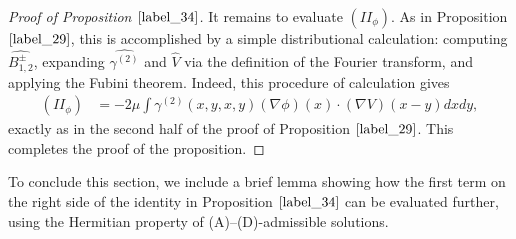 \documentclass[reqno]{amsart}
\numberwithin{equation}{section}
\theoremstyle{remark}
\begin{document}
\begin{proof}[Proof of Proposition $\ref{label_34}$]
It remains to evaluate $(II_\phi)$.  As in Proposition $\ref{label_29}$, this is accomplished by a simple distributional calculation: computing $\widehat{B^\pm_{1,2}}$, expanding $\widehat{\gamma^{(2)}}$ and $\widehat{V}$ via the definition of the Fourier transform, and applying the Fubini theorem.  Indeed, this procedure of calculation gives
\begin{align*}
(II_\phi)&=-2\mu \int \gamma^{(2)}(x,y,x,y)(\nabla \phi)(x)\cdot (\nabla V)(x-y)dxdy,
\end{align*}
exactly as in the second half of the proof of Proposition $\ref{label_29}$.  This completes the proof of the proposition.
\end{proof}

To conclude this section, we include a brief lemma showing how the first term on the right side of the identity in Proposition $\ref{label_34}$ can be evaluated further, using the Hermitian property of (A)--(D)-admissible solutions.
\end{document}
